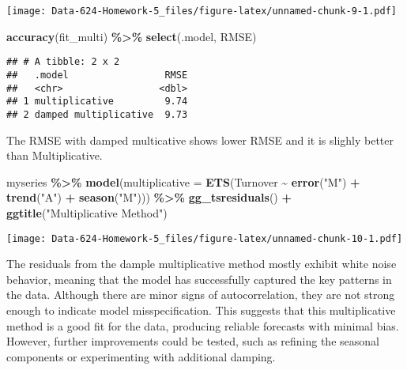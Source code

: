 \documentclass[
]{article}
\newenvironment{Shaded}{\begin{snugshade}}{\end{snugshade}}
\newcommand{\AttributeTok}[1]{\textcolor[rgb]{0.13,0.29,0.53}{#1}}
\newcommand{\FunctionTok}[1]{\textcolor[rgb]{0.13,0.29,0.53}{\textbf{#1}}}
\newcommand{\NormalTok}[1]{#1}
\newcommand{\SpecialCharTok}[1]{\textcolor[rgb]{0.81,0.36,0.00}{\textbf{#1}}}
\newcommand{\StringTok}[1]{\textcolor[rgb]{0.31,0.60,0.02}{#1}}
\begin{document}
\texttt{[image: Data-624-Homework-5\_files/figure-latex/unnamed-chunk-9-1.pdf]}

\begin{Shaded}
\begin{Highlighting}[]
\FunctionTok{accuracy}\NormalTok{(fit\_multi) }\SpecialCharTok{\%\textgreater{}\%} \FunctionTok{select}\NormalTok{(.model, RMSE)}
\end{Highlighting}
\end{Shaded}

\begin{verbatim}
## # A tibble: 2 x 2
##   .model                 RMSE
##   <chr>                 <dbl>
## 1 multiplicative         9.74
## 2 damped multiplicative  9.73
\end{verbatim}

The RMSE with damped multicative shows lower RMSE and it is slighly
better than Multiplicative.

\begin{Shaded}
\begin{Highlighting}[]
\NormalTok{myseries }\SpecialCharTok{\%\textgreater{}\%}
  \FunctionTok{model}\NormalTok{(}\AttributeTok{multiplicative =} \FunctionTok{ETS}\NormalTok{(Turnover }\SpecialCharTok{\textasciitilde{}} \FunctionTok{error}\NormalTok{(}\StringTok{"M"}\NormalTok{) }\SpecialCharTok{+} \FunctionTok{trend}\NormalTok{(}\StringTok{"A"}\NormalTok{) }\SpecialCharTok{+} \FunctionTok{season}\NormalTok{(}\StringTok{"M"}\NormalTok{))) }\SpecialCharTok{\%\textgreater{}\%}
  \FunctionTok{gg\_tsresiduals}\NormalTok{() }\SpecialCharTok{+}
  \FunctionTok{ggtitle}\NormalTok{(}\StringTok{"Multiplicative Method"}\NormalTok{)}
\end{Highlighting}
\end{Shaded}

\texttt{[image: Data-624-Homework-5\_files/figure-latex/unnamed-chunk-10-1.pdf]}

The residuals from the dample multiplicative method mostly exhibit white
noise behavior, meaning that the model has successfully captured the key
patterns in the data. Although there are minor signs of autocorrelation,
they are not strong enough to indicate model misspecification. This
suggests that this multiplicative method is a good fit for the data,
producing reliable forecasts with minimal bias. However, further
improvements could be tested, such as refining the seasonal components
or experimenting with additional damping.
\end{document}
